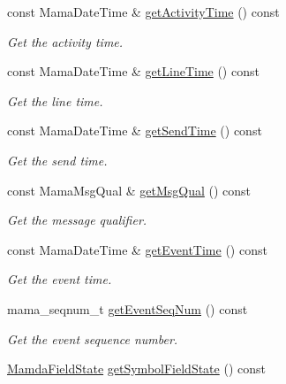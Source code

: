 \begin{CompactItemize}
const Mama\-Date\-Time \& \hyperlink{classWombat_1_1MamdaBookAtomicListener_84a6cb534ed359f19138a48d9f1f2812}{get\-Activity\-Time} () const 
\begin{CompactList}\small\item\em Get the activity time. \item\end{CompactList}\item 
const Mama\-Date\-Time \& \hyperlink{classWombat_1_1MamdaBookAtomicListener_e390bbef9be51d4e4a63f3c7bab42926}{get\-Line\-Time} () const 
\begin{CompactList}\small\item\em Get the line time. \item\end{CompactList}\item 
const Mama\-Date\-Time \& \hyperlink{classWombat_1_1MamdaBookAtomicListener_b3acc7062c4aefa9bc7da4a6f810f5d1}{get\-Send\-Time} () const 
\begin{CompactList}\small\item\em Get the send time. \item\end{CompactList}\item 
const Mama\-Msg\-Qual \& \hyperlink{classWombat_1_1MamdaBookAtomicListener_f51b3cfbfefe29104627fe7fec17f1a2}{get\-Msg\-Qual} () const 
\begin{CompactList}\small\item\em Get the message qualifier. \item\end{CompactList}\item 
const Mama\-Date\-Time \& \hyperlink{classWombat_1_1MamdaBookAtomicListener_b84977f1c114cc2841c34e0d0efa9055}{get\-Event\-Time} () const 
\begin{CompactList}\small\item\em Get the event time. \item\end{CompactList}\item 
mama\_\-seqnum\_\-t \hyperlink{classWombat_1_1MamdaBookAtomicListener_8110769b71d79b631531693c52449b72}{get\-Event\-Seq\-Num} () const 
\begin{CompactList}\small\item\em Get the event sequence number. \item\end{CompactList}\item 
\hyperlink{namespaceWombat_93aac974f2ab713554fd12a1fa3b7d2a}{Mamda\-Field\-State} \hyperlink{classWombat_1_1MamdaBookAtomicListener_6d0fa4b94f34bf538d1324ee65a08cdf}{get\-Symbol\-Field\-State} () const 

\end{CompactItemize}
